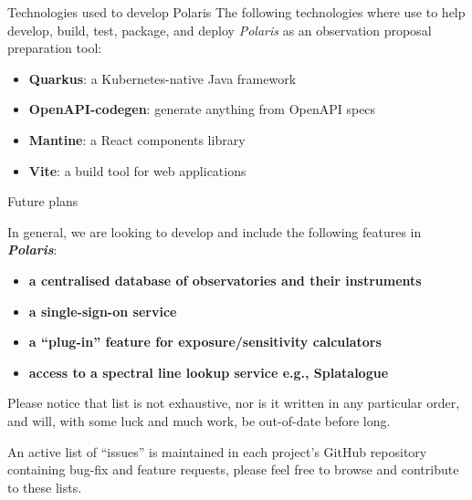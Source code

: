 \documentclass[final]{beamer}
\newlength{\colwidth}
\begin{document}
\begin{frame}[t]
\begin{columns}[t]
\begin{column}{\colwidth}
\begin{block}{Technologies used to develop Polaris}
                    The following technologies where use to help develop, build, test, package, and deploy
                    \emph{Polaris} as an observation proposal preparation tool:

                    \begin{itemize}
                        \item \textbf{Quarkus}: a Kubernetes-native Java framework
                        \item \textbf{OpenAPI-codegen}: generate anything from OpenAPI specs
                        \item \textbf{Mantine}: a React components library
                        \item \textbf{Vite}: a build tool for web applications
                    \end{itemize}

                \end{block}

                \begin{exampleblock}{Future plans}

                    In general, we are looking to develop and include the following features in
                    \textbf{\emph{Polaris}}:

                    \begin{itemize}
                        \item \textbf{a centralised database of observatories and their instruments}
                        \item \textbf{a single-sign-on service}
                        \item \textbf{a ``plug-in'' feature for exposure/sensitivity calculators}
                        \item \textbf{access to a spectral line lookup service e.g., Splatalogue}
                    \end{itemize}

                    Please notice that list is not exhaustive, nor is it written in any particular order,
                    and will, with some luck and much work, be out-of-date before long.

                    An active list of ``issues'' is maintained in each project's GitHub repository containing
                    bug-fix and feature requests, please feel free to browse and contribute to these lists.

                \end{exampleblock}


\end{column}
\end{columns}
\end{frame}
\end{document}
